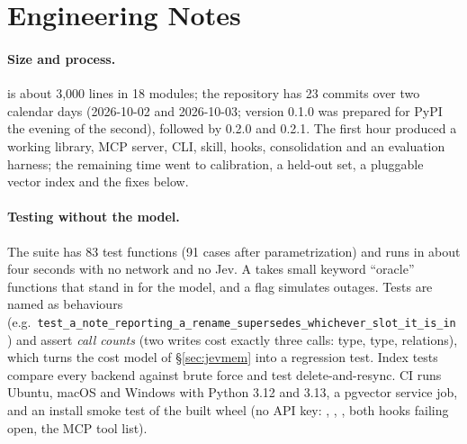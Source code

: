 \section{Engineering Notes}
\label{sec:eng}

\paragraph{Size and process.} \jevmem{} is about 3{,}000 lines in 18 modules; the repository has 23 commits over two calendar days (2026-10-02 and 2026-10-03; version 0.1.0 was prepared for PyPI the evening of the second), followed by 0.2.0 and 0.2.1. The first hour produced a working library, MCP server, CLI, skill, hooks, consolidation and an evaluation harness; the remaining time went to calibration, a held-out set, a pluggable vector index and the fixes below.

\paragraph{Testing without the model.} The suite has 83 test functions (91 cases after parametrization) and runs in about four seconds with no network and no Jev. A  takes small keyword ``oracle'' functions that stand in for the model, and a  flag simulates outages. Tests are named as behaviours (e.g.\ \texttt{test\_a\_note\_reporting\_\allowbreak a\_rename\_\allowbreak supersedes\_\allowbreak whichever\_\allowbreak slot\_it\_is\_in}) and assert \emph{call counts} (two writes cost exactly three calls: type, type, relations), which turns the cost model of \S\ref{sec:jevmem} into a regression test. Index tests compare every backend against brute force and test delete-and-resync. CI runs Ubuntu, macOS and Windows with Python 3.12 and 3.13, a pgvector service job, and an install smoke test of the built wheel (no API key: , , , both hooks failing open, the MCP tool list).

